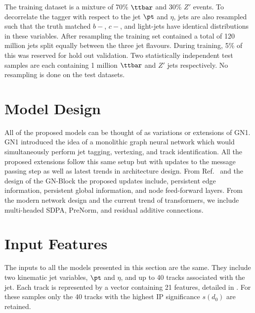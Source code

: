 The training dataset is a mixture of 70\% $\ttbar$ and 30\% $Z'$ events.
To decorrelate the tagger with respect to the jet $\pt$ and $\eta$, jets are also resampled such that the truth matched $b-$, $c-$, and light-jets have identical distributions in these variables.
After resampling the training set contained a total of 120 million jets split equally between the three jet flavours.
During training, 5\% of this was reserved for hold out validation.
Two statistically independent test samples are each containing 1 million $\ttbar$ and $Z'$ jets respectively.
No resampling is done on the test datasets.

\section{Model Design}

All of the proposed models can be thought of as variations or extensions of GN1.
GN1 introduced the idea of a monolithic graph neural network which would simultaneously perform jet tagging, vertexing, and track identification.
All the proposed extensions follow this same setup but with updates to the message passing step as well as latest trends in architecture design.
From Ref.~\cite{RelationalInductiveBiases} and the design of the GN-Block the proposed updates include, persistent edge information, persistent global information, and node feed-forward layers.
From the modern network design and the current trend of transformers, we include multi-headed SDPA, PreNorm, and residual additive connections.

\section{Input Features}

The inputs to all the models presented in this section are the same.
They include two kinematic jet variables, $\pt$ and $\eta$, and up to 40 tracks associated with the jet.
Each track is represented by a vector containing 21 features, detailed in .
For these samples only the 40 tracks with the highest IP significance $s(d_0)$ are retained.


